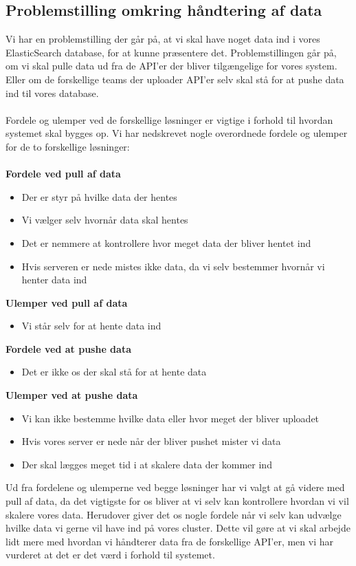 \subsection{Problemstilling omkring håndtering af data}
Vi har en problemstilling der går på, at vi skal have noget data ind i vores ElasticSearch database, for at kunne præsentere det.
Problemstillingen går på, om vi skal pulle data ud fra de API'er der bliver tilgængelige for vores system. Eller om de forskellige teams der uploader API'er selv skal stå for at pushe data ind til vores database.
\\\\
Fordele og ulemper ved de forskellige løsninger er vigtige i forhold til hvordan systemet skal bygges op.
Vi har nedskrevet nogle overordnede fordele og ulemper for de to forskellige løsninger:
\\\\
\textbf{Fordele ved pull af data}
\begin{itemize}
    \item{Der er styr på hvilke data der hentes}
    \item{Vi vælger selv hvornår data skal hentes}
    \item{Det er nemmere at kontrollere hvor meget data der bliver hentet ind}
    \item{Hvis serveren er nede mistes ikke data, da vi selv bestemmer hvornår vi henter data ind}
\end{itemize}
\textbf{Ulemper ved pull af data}
\begin{itemize}
    \item{Vi står selv for at hente data ind}
\end{itemize}
\textbf{Fordele ved at pushe data}
\begin{itemize}
    \item{Det er ikke os der skal stå for at hente data}
\end{itemize}
\textbf{Ulemper ved at pushe data}
\begin{itemize}
    \item{Vi kan ikke bestemme hvilke data eller hvor meget der bliver uploadet}
    \item{Hvis vores server er nede når der bliver pushet mister vi data}
    \item{Der skal lægges meget tid i at skalere data der kommer ind}
\end{itemize}
Ud fra fordelene og ulemperne ved begge løsninger har vi valgt at gå videre med pull af data, da det vigtigste for os bliver at vi selv kan kontrollere hvordan vi vil skalere vores data. Herudover giver det os nogle fordele når vi selv kan udvælge hvilke data vi gerne vil have ind på vores cluster. Dette vil gøre at vi skal arbejde lidt mere med hvordan vi håndterer data fra de forskellige API'er, men vi har vurderet at det er det værd i forhold til systemet.
